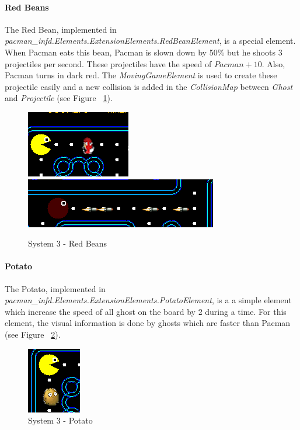 \documentclass[]{article}
\begin{document}
\paragraph{Red Beans} The Red Bean, implemented in \textit{pacman\_infd.Elements.ExtensionElements.RedBeanElement}, is a special element. When Pacman eats this bean, Pacman is slown down by 50\% but he shoots 3 projectiles per second. These projectiles have the speed of $Pacman + 10$. Also, Pacman turns in dark red. The \textit{MovingGameElement} is used to create these projectile easily and a new collision is added in the \textit{CollisionMap} between \textit{Ghost} and \textit{Projectile} (see Figure ~\ref{fig:system3RedBeans}).

\begin{figure}
\centering
    \includegraphics[width=.3\linewidth]{imgs/redBeanElement1.PNG}
    \includegraphics[width=.6\linewidth]{imgs/redBeanElement2.PNG}
    \caption{System 3 - Red Beans}
    \label{fig:system3RedBeans}
\end{figure}

\paragraph{Potato} The Potato, implemented in \textit{pacman\_infd.Elements.ExtensionElements.PotatoElement}, is a a simple element which increase the speed of all ghost on the board by 2 during a time. For this element, the visual information is done by ghosts which are faster than Pacman (see Figure ~\ref{fig:system3Potato}).

\begin{figure}
\centering
    \includegraphics[width=.3\linewidth]{imgs/potato.PNG}
    \caption{System 3 - Potato}
    \label{fig:system3Potato}
\end{figure}
\end{document}
